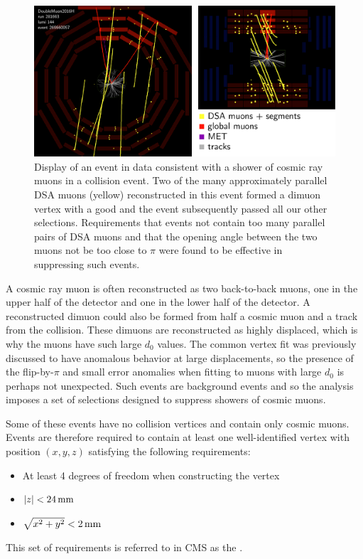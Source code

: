 \begin{figure}[htpb]
  \centering
  \includegraphics[width=\textwidth]{figures/displaced/ED_Cosmic.pdf}
  \caption{Display of an event in data consistent with a shower of cosmic ray muons in a \pp collision event. Two of the many approximately parallel DSA muons (yellow) reconstructed in this event formed a dimuon vertex with a good \vchisq and the event subsequently passed all our other selections. Requirements that events not contain too many parallel pairs of DSA muons and that the opening angle between the two muons not be too close to $\pi$ were found to be effective in suppressing such events.}
  \label{fig:dd:shower}
\end{figure}

A cosmic ray muon is often reconstructed as two back-to-back muons, one in the upper half of the detector and one in the lower half of the detector.
A reconstructed dimuon could also be formed from half a cosmic muon and a track from the \pp collision.
These dimuons are reconstructed as highly displaced, which is why the muons have such large $d_0$ values.
The common vertex fit was previously discussed to have anomalous behavior at large displacements, so the presence of the flip-by-$\pi$ and small \pT error anomalies when fitting to muons with large $d_0$ is perhaps not unexpected.
Such events are background events and so the analysis imposes a set of selections designed to suppress showers of cosmic muons.

Some of these events have no \pp collision vertices and contain only cosmic muons.
Events are therefore required to contain at least one well-identified vertex with position $(x, y, z)$ satisfying the following requirements:
\begin{itemize}
  \item At least 4 degrees of freedom when constructing the vertex
  \item $|z| < 24\,\text{mm}$
  \item $\sqrt{x^2 + y^2} < 2\,\text{mm}$
\end{itemize}
This set of requirements is referred to in CMS as the .


